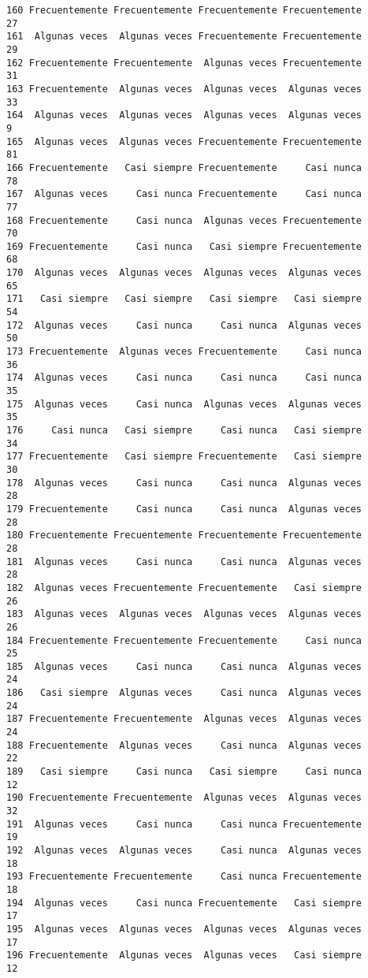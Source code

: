 \documentclass[
  letterpaper,
  DIV=11,
  numbers=noendperiod]{scrartcl}
\begin{document}
\begin{verbatim}
160 Frecuentemente Frecuentemente Frecuentemente Frecuentemente      27
161  Algunas veces  Algunas veces Frecuentemente Frecuentemente      29
162 Frecuentemente Frecuentemente  Algunas veces Frecuentemente      31
163 Frecuentemente  Algunas veces  Algunas veces  Algunas veces      33
164  Algunas veces  Algunas veces  Algunas veces  Algunas veces       9
165  Algunas veces  Algunas veces Frecuentemente Frecuentemente      81
166 Frecuentemente   Casi siempre Frecuentemente     Casi nunca      78
167  Algunas veces     Casi nunca Frecuentemente     Casi nunca      77
168 Frecuentemente     Casi nunca  Algunas veces Frecuentemente      70
169 Frecuentemente     Casi nunca   Casi siempre Frecuentemente      68
170  Algunas veces  Algunas veces  Algunas veces  Algunas veces      65
171   Casi siempre   Casi siempre   Casi siempre   Casi siempre      54
172  Algunas veces     Casi nunca     Casi nunca  Algunas veces      50
173 Frecuentemente  Algunas veces Frecuentemente     Casi nunca      36
174  Algunas veces     Casi nunca     Casi nunca     Casi nunca      35
175  Algunas veces     Casi nunca  Algunas veces  Algunas veces      35
176     Casi nunca   Casi siempre     Casi nunca   Casi siempre      34
177 Frecuentemente   Casi siempre Frecuentemente   Casi siempre      30
178  Algunas veces     Casi nunca     Casi nunca  Algunas veces      28
179 Frecuentemente     Casi nunca     Casi nunca  Algunas veces      28
180 Frecuentemente Frecuentemente Frecuentemente Frecuentemente      28
181  Algunas veces     Casi nunca     Casi nunca  Algunas veces      28
182  Algunas veces Frecuentemente Frecuentemente   Casi siempre      26
183  Algunas veces  Algunas veces  Algunas veces  Algunas veces      26
184 Frecuentemente Frecuentemente Frecuentemente     Casi nunca      25
185  Algunas veces     Casi nunca     Casi nunca  Algunas veces      24
186   Casi siempre  Algunas veces     Casi nunca  Algunas veces      24
187 Frecuentemente Frecuentemente  Algunas veces  Algunas veces      24
188 Frecuentemente  Algunas veces     Casi nunca  Algunas veces      22
189   Casi siempre     Casi nunca   Casi siempre     Casi nunca      12
190 Frecuentemente Frecuentemente  Algunas veces  Algunas veces      32
191  Algunas veces     Casi nunca     Casi nunca Frecuentemente      19
192  Algunas veces  Algunas veces     Casi nunca  Algunas veces      18
193 Frecuentemente Frecuentemente     Casi nunca Frecuentemente      18
194  Algunas veces     Casi nunca Frecuentemente   Casi siempre      17
195  Algunas veces  Algunas veces  Algunas veces  Algunas veces      17
196 Frecuentemente  Algunas veces  Algunas veces   Casi siempre      12

\end{verbatim}
\end{document}
